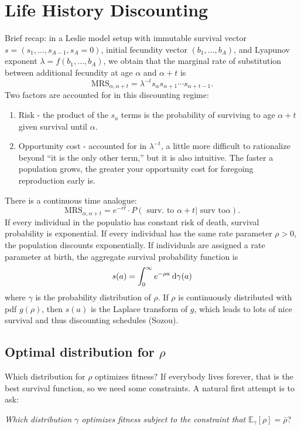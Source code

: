 \section{Life History Discounting}
Brief recap: in a Leslie model setup with immutable survival vector $s = (s_1, \ldots, s_{A-1}, s_A = 0)$, initial
fecundity vector $(b_1, \ldots, b_A)$, and
Lyapunov exponent $\lambda = f(b_1, \ldots, b_A)$, we obtain that the marginal rate of substitution between additional fecundity
at age $\alpha$ and $\alpha+t$ is 
$$ \text{MRS}_{\alpha, \alpha+t} = \lambda^{-t}s_{\alpha}s_{\alpha+1}\cdots s_{\alpha+t - 1}.$$
Two factors are accounted for in this discounting regime:
\begin{enumerate}
    \item Risk - the product of the $s_a$ terms is the probability of surviving to age $\alpha+t$ given survival until $\alpha$. 
    \item Opportunity cost - accounted for in $\lambda^{-t}$, a little more difficult to rationalize beyond ``it is the only other term,''
        but it is also intuitive. The faster a population grows, the greater your opportunity cost for foregoing reproduction early is. 
\end{enumerate}
There is a continuous time analogue:
$$ \text{MRS}_{\alpha, \alpha+t} = e^{-rt}\cdot P(\text{ surv. to }\alpha+t | \text{ surv to} \alpha).
$$
If every individual in the populatio has constant risk of death, survival probability is exponential. If every individual has the same
rate parameter $\rho>0$, the population discounts exponentially. If individuals are assigned a rate parameter at birth, the aggregate
survival probability function is
$$ s(a) = \int_0^\infty e^{-\rho a} \:\textrm{d}\gamma(a) $$
where $\gamma$ is the probability distribution of $\rho$. If $\rho$ is continuously distributed with pdf $g(\rho)$, then 
$s(a)$ is the Laplace transform of $g$, which leads to lots of nice survival and thus discounting schedules (Sozou). 

\subsection{Optimal distribution for $\rho$}
Which distribution for $\rho$ optimizes fitness? If everybody lives forever, that is the best survival function, so we need
some constraints. A natural first attempt is to ask:

\begin{center}
    \textit{Which distribution $\gamma$ optimizes fitness subject to the constraint that 
    $\mathbb{E}_{\gamma}\left[ \rho \right] = \bar{\rho}$}?
\end{center}

